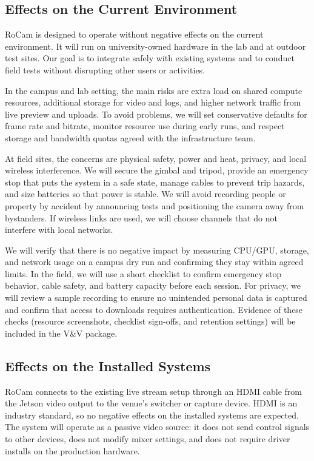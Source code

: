 \documentclass[12pt]{article}
\begin{document}
\subsection{Effects on the Current Environment}

RoCam is designed to operate without negative effects on the current
environment. It will run on university-owned hardware in the lab and at outdoor
test sites. Our goal is to integrate safely with existing systems and to
conduct field tests without disrupting other users or activities.

In the campus and lab setting, the main risks are extra load on shared compute
resources, additional storage for video and logs, and higher network traffic
from live preview and uploads. To avoid problems, we will set conservative
defaults for frame rate and bitrate, monitor resource use during early runs,
and respect storage and bandwidth quotas agreed with the infrastructure team.

At field sites, the concerns are physical safety, power and heat, privacy, and
local wireless interference. We will secure the gimbal and tripod, provide an
emergency stop that puts the system in a safe state, manage cables to prevent
trip hazards, and size batteries so that power is stable. We will avoid
recording people or property by accident by announcing tests and positioning
the camera away from bystanders. If wireless links are used, we will choose
channels that do not interfere with local networks.

We will verify that there is no negative impact by measuring CPU/GPU, storage,
and network usage on a campus dry run and confirming they stay within agreed
limits. In the field, we will use a short checklist to confirm emergency stop
behavior, cable safety, and battery capacity before each session. For privacy,
we will review a sample recording to ensure no unintended personal data is
captured and confirm that access to downloads requires authentication. Evidence
of these checks (resource screenshots, checklist sign-offs, and retention
settings) will be included in the V\&V package.

\subsection{Effects on the Installed Systems}

RoCam connects to the existing live stream setup through an HDMI cable from the
Jetson video output to the venue’s switcher or capture device. HDMI is an
industry standard, so no negative effects on the installed systems are
expected. The system will operate as a passive video source: it does not send
control signals to other devices, does not modify mixer settings, and does not
require driver installs on the production hardware.
\end{document}
